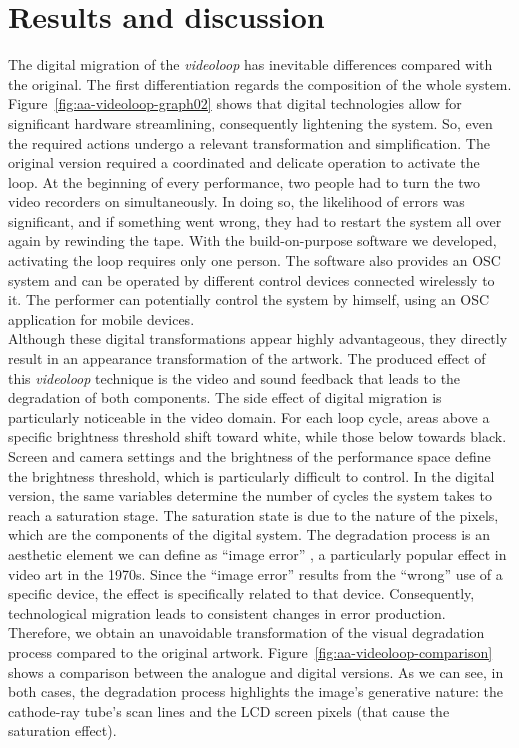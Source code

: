 \section{Results and discussion}
The digital migration of the \textit{videoloop} has inevitable differences compared with the original. The first differentiation regards the composition of the whole system. Figure~\ref{fig:aa-videoloop-graph02} shows that digital technologies allow for significant hardware streamlining, consequently lightening the system. So, even the required actions undergo a relevant transformation and simplification. The original version required a coordinated and delicate operation to activate the loop. At the beginning of every performance, two people had to turn the two video recorders on simultaneously. In doing so, the likelihood of errors was significant, and if something went wrong, they had to restart the system all over again by rewinding the tape. With the build-on-purpose software we developed, activating the loop requires only one person. The software also provides an OSC system and can be operated by different control devices connected wirelessly to it. The performer can potentially control the system by himself, using an OSC application for mobile devices.\\
Although these digital transformations appear highly advantageous, they directly result in an appearance transformation of the artwork. The produced effect of this \textit{videoloop} technique is the video and sound feedback that leads to the degradation of both components. The side effect of digital migration is particularly noticeable in the video domain. For each loop cycle, areas above a specific brightness threshold shift toward white, while those below towards black. Screen and camera settings and the brightness of the performance space define the brightness threshold, which is particularly difficult to control. In the digital version, the same variables determine the number of cycles the system takes to reach a saturation stage. The saturation state is due to the nature of the pixels, which are the components of the digital system. The degradation process is an aesthetic element we can define as ``image error'' \cite{Gfeller2013-je}, a particularly popular effect in video art in the 1970s. Since the ``image error'' results from the ``wrong'' use of a specific device, the effect is specifically related to that device. Consequently, technological migration leads to consistent changes in error production. Therefore, we obtain an unavoidable transformation of the visual degradation process compared to the original artwork. Figure~\ref{fig:aa-videoloop-comparison} shows a comparison between the analogue and digital versions. As we can see, in both cases, the degradation process highlights the image's generative nature: the cathode-ray tube's scan lines and the LCD screen pixels (that cause the saturation effect).

